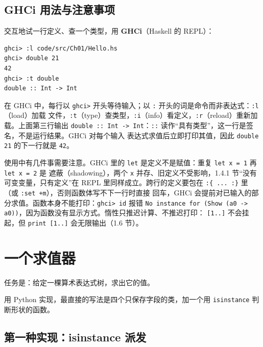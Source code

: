 \subsection{GHCi 用法与注意事项}\label{ghci-ux7528ux6cd5ux4e0eux6ce8ux610fux4e8bux9879}

交互地试一行定义、查一个类型，用 \textbf{GHCi}（Haskell 的 REPL）：

\begin{lstlisting}
ghci> :l code/src/Ch01/Hello.hs
ghci> double 21
42
ghci> :t double
double :: Int -> Int
\end{lstlisting}

在 GHCi 中，每行以 \passthrough{\lstinline!ghci>!} 开头等待输入；以 \passthrough{\lstinline!:!} 开头的词是命令而非表达式：\passthrough{\lstinline!:l!}（load）加载
文件，\passthrough{\lstinline!:t!}（type）查类型，\passthrough{\lstinline!:i!}（info）看定义，\passthrough{\lstinline!:r!}（reload）重新加载。上面第三行输出
\passthrough{\lstinline!double :: Int -> Int!}：\passthrough{\lstinline!::!} 读作“具有类型”，这一行是签名，不是运行结果。GHCi 对每个输入
表达式求值后立即打印其值，因此 \passthrough{\lstinline!double 21!} 的下一行就是 \passthrough{\lstinline!42!}。

使用中有几件事需要注意。GHCi 里的 \passthrough{\lstinline!let!} 是定义不是赋值：重复 \passthrough{\lstinline!let x = 1!} 再 \passthrough{\lstinline!let x = 2!} 是
遮蔽（shadowing），两个 \passthrough{\lstinline!x!} 并存、旧定义不受影响，1.4.1 节“没有可变变量，只有定义”在 REPL
里同样成立。跨行的定义要包在 \passthrough{\lstinline!:\{ ... :\}!} 里（或 \passthrough{\lstinline!:set +m!}），否则函数体写不下一行时直接
回车，GHCi 会提前对已输入的部分求值。函数本身不能打印：\passthrough{\lstinline!ghci> id!} 报错
\passthrough{\lstinline!No instance for (Show (a0 -> a0))!}，因为函数没有显示方式。惰性只推迟计算、不推迟打印：
\passthrough{\lstinline![1..]!} 不会挂起，但 \passthrough{\lstinline!print [1..]!} 会无限输出（1.6 节）。

\section{一个求值器}\label{ux4e00ux4e2aux6c42ux503cux5668}

任务是：给定一棵算术表达式树，求出它的值。

用 Python 实现，最直接的写法是四个只保存字段的类，加一个用 \passthrough{\lstinline!isinstance!} 判断形状的函数。

\subsection{第一种实现：isinstance 派发}\label{ux7b2cux4e00ux79cdux5b9eux73b0isinstance-ux6d3eux53d1}

